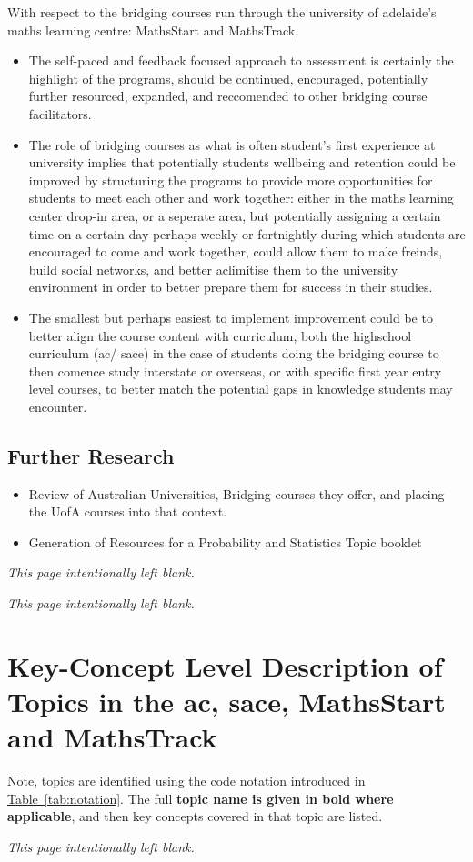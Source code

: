 \documentclass[twoside,12pt,a4paper]{report}
\makeatletter
\newcommand*{\intentionallyblankpage}{
  \vspace*{\fill}
  {\centering \textit{This page intentionally left blank.} \par}
  \vspace{\fill}}
\renewcommand*{\cleardoublepage}{\clearpage\if@twoside \ifodd\c@page\else
  \intentionallyblankpage
  \newpage
  \if@twocolumn\hbox{}\newpage\fi\fi\fi}
\newcommand{\reftab}[1]{\hyperref[tab:#1]{Table~\ref{tab:#1}}}
\makeatother
\begin{document}
With respect to the bridging courses run through the university of adelaide's maths learning centre: MathsStart and MathsTrack,
\begin{itemize}
	\item The self-paced and feedback focused approach to assessment is certainly the highlight of the programs, should be continued, encouraged, potentially further resourced, expanded, and reccomended to other bridging course facilitators.
	\item The role of bridging courses as what is often student's first experience at university implies that potentially students wellbeing and retention could be improved by structuring the programs to provide more opportunities for students to meet each other and work together: either in the maths learning center drop-in area, or a seperate area, but potentially assigning a certain time on a certain day perhaps weekly or fortnightly during which students are encouraged to come and work together, could allow them to make freinds, build social networks, and better aclimitise them to the university environment in order to better prepare them for success in their studies.
	\item The smallest but perhaps easiest to implement improvement could be to better align the course content with curriculum, both the highschool curriculum (\gls{ac}/ \gls{sace}) in the case of students doing the bridging course to then comence study interstate or overseas, or with specific first year entry level courses, to better match the potential gaps in knowledge students may encounter.
\end{itemize}



\section{Further Research}

\begin{itemize}
	\item Review of Australian Universities, Bridging courses they offer, and placing the UofA courses into that context.
	\item Generation of Resources for a Probability and Statistics Topic booklet
\end{itemize}


\cleardoublepage
\begin{appendices}

\cleardoublepage
\chapter{Key-Concept Level Description of Topics in the \gls{ac}, \gls{sace}, MathsStart and MathsTrack}
\label{app:concepts}

Note, topics are identified using the code notation introduced in \reftab{notation}. The full \textbf{topic name is given in bold where applicable}, and then key concepts covered in that topic are listed.



\end{appendices}

\glsresetall
\cleardoublepage

 
\end{document}
